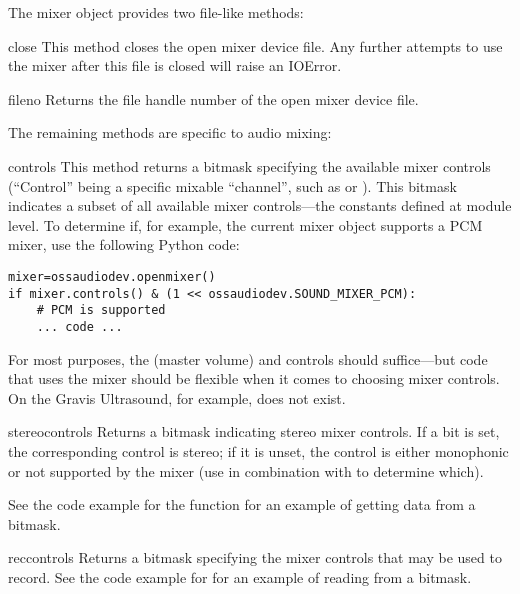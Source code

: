 The mixer object provides two file-like methods:

\begin{methoddesc}{close}{}
This method closes the open mixer device file.  Any further attempts to
use the mixer after this file is closed will raise an IOError.
\end{methoddesc}

\begin{methoddesc}{fileno}{}
Returns the file handle number of the open mixer device file.
\end{methoddesc}

The remaining methods are specific to audio mixing:

\begin{methoddesc}{controls}{}
This method returns a bitmask specifying the available mixer controls
(``Control'' being a specific mixable ``channel'', such as
 or ).  This
bitmask indicates a subset of all available mixer controls---the
 constants defined at module level.  To determine if,
for example, the current mixer object supports a PCM mixer, use the
following Python code:

\begin{verbatim}
mixer=ossaudiodev.openmixer()
if mixer.controls() & (1 << ossaudiodev.SOUND_MIXER_PCM):
    # PCM is supported
    ... code ...
\end{verbatim}

For most purposes, the  (master volume) and
 controls should suffice---but code that uses the
mixer should be flexible when it comes to choosing mixer controls.  On
the Gravis Ultrasound, for example,  does not
exist.
\end{methoddesc}

\begin{methoddesc}{stereocontrols}{}
Returns a bitmask indicating stereo mixer controls.  If a bit is set,
the corresponding control is stereo; if it is unset, the control is
either monophonic or not supported by the mixer (use in combination with
 to determine which).

See the code example for the  function for an example
of getting data from a bitmask.
\end{methoddesc}

\begin{methoddesc}{reccontrols}{}
Returns a bitmask specifying the mixer controls that may be used to
record.  See the code example for  for an example of
reading from a bitmask.
\end{methoddesc}

